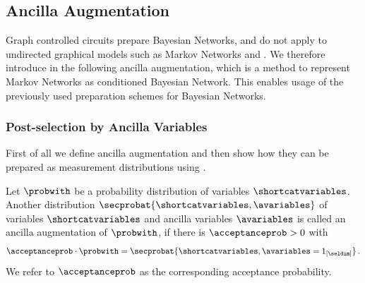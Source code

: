 \subsection{Ancilla Augmentation}

Graph controlled circuits prepare Bayesian Networks, and do not apply to undirected graphical models such as Markov Networks and \ComputationActivationNetworks{}.
We therefore introduce in the following ancilla augmentation, which is a method to represent Markov Networks as conditioned Bayesian Network.
This enables usage of the previously used preparation schemes for Bayesian Networks.

\subsubsection{Post-selection by Ancilla Variables}

First of all we define ancilla augmentation and then show how they can be prepared as measurement distributions using \activationCircuits{}.

\begin{definition}
    Let $\probwith$ be a probability distribution of variables $\shortcatvariables$.
    Another distribution $\secprobat{\shortcatvariables,\avariables}$ of variables $\shortcatvariables$ and ancilla variables $\avariables$ is called an ancilla augmentation of $\probwith$, if there is $\acceptanceprob>0$ with
    \begin{align*}
        \acceptanceprob \cdot \probwith
        = \secprobat{\shortcatvariables,\avariables=1_{[\seldim]}} \, .
    \end{align*}
    We refer to $\acceptanceprob$ as the corresponding acceptance probability.
\end{definition}

%

